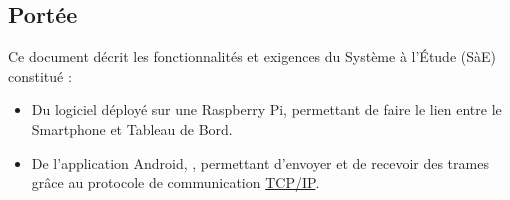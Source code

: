\subsection{Portée} %
Ce document décrit les fonctionnalités et exigences du Système à l'Étude (SàE) constitué :
\begin{itemize} %
    \item Du logiciel {\nomLogiciel} déployé sur une Raspberry Pi, permettant de faire le lien entre le Smartphone et Tableau de Bord.
    \item De l'application Android, {\nomApplication}, permettant d'envoyer et de recevoir des trames grâce au protocole de communication \hyperref[tcp_ip]{TCP/IP}.
\end{itemize}